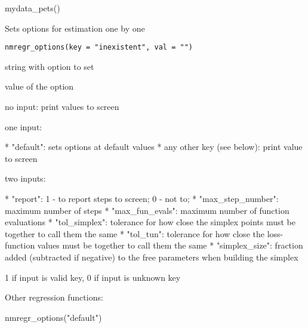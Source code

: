 \documentclass[a4paper]{book}
\begin{document}
%
\begin{Examples}
\begin{ExampleCode}
mydata_pets()
\end{ExampleCode}
\end{Examples}
%
\begin{Description}\relax
Sets options for estimation one by one
\end{Description}
%
\begin{Usage}
\begin{verbatim}
nmregr_options(key = "inexistent", val = "")
\end{verbatim}
\end{Usage}
%
\begin{Arguments}
\begin{ldescription}
\item[\code{key}] string with option to set

\item[\code{val}] value of the option
\end{ldescription}
\end{Arguments}
%
\begin{Details}\relax
no input: print values to screen

one input:

* "default": sets options at default values
* any other key (see below): print value to screen

two inputs:

* "report": 1 - to report steps to screen; 0 - not to;
* "max\_step\_number": maximum number of steps
* "max\_fun\_evals": maximum number of function evaluations
* "tol\_simplex": tolerance for how close the simplex points must be together to call them the same
* "tol\_tun": tolerance for how close the loss-function values must be together to call them the same
* "simplex\_size": fraction added (subtracted if negative) to the free parameters when building the simplex
\end{Details}
%
\begin{Value}
1 if input is valid key, 0 if input is unknown key
\end{Value}
%
\begin{SeeAlso}\relax
Other regression functions: 
\end{SeeAlso}
%
\begin{Examples}
\begin{ExampleCode}
nmregr_options("default")
\end{ExampleCode}
\end{Examples}
\end{document}
